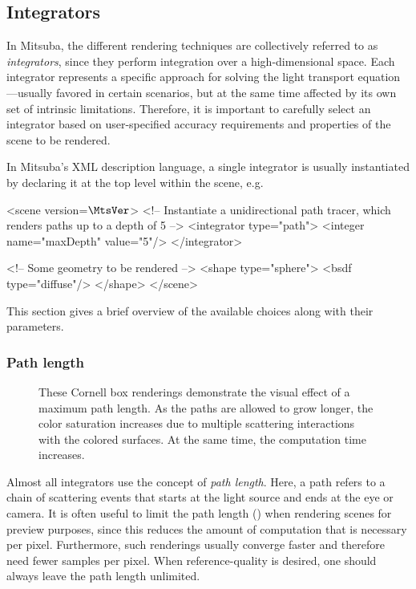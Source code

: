 \newpage
\subsection{Integrators}
\label{sec:integrators}
In Mitsuba, the different rendering techniques are collectively referred to as 
\emph{integrators}, since they perform integration over a high-dimensional
space. Each integrator represents a specific approach for solving
the light transport equation---usually favored in certain scenarios, but
at the same time affected by its own set of intrinsic limitations.
Therefore, it is important to carefully select an integrator based on 
user-specified accuracy requirements and properties of the scene to be 
rendered. 

In Mitsuba's XML description language, a single integrator
is usually instantiated by declaring it at the top level within the
scene, e.g.
\begin{xml}
<scene version=$\MtsVer$>
	<!-- Instantiate a unidirectional path tracer,
	     which renders paths up to a depth of 5 -->
	<integrator type="path">
		<integer name="maxDepth" value="5"/>
	</integrator>

	<!-- Some geometry to be rendered -->
	<shape type="sphere">
		<bsdf type="diffuse"/>
	</shape>
</scene>
\end{xml}

This section gives a brief overview of the available choices 
along with their parameters.

\subsubsection*{Path length}
\begin{figure}[htb!]
\centering
\hfill
{}
\caption{
	\label{fig:pathlengths}
	These Cornell box renderings demonstrate the visual 
	effect of a maximum path length. As the paths
	are allowed to grow longer, the color saturation
	increases due to multiple scattering interactions
	with the colored surfaces. At the same time, the
	computation time increases.
}
\end{figure}

Almost all integrators use the concept of \emph{path length}.
Here, a path refers to a chain of scattering events that 
starts at the light source and ends at the eye or camera.
It is often useful to limit the path length () 
when rendering scenes for preview purposes, since this reduces the amount 
of computation that is necessary per pixel. Furthermore, such renderings
usually converge faster and therefore need fewer samples per pixel.
When reference-quality is desired, one should always leave the path 
length unlimited.

